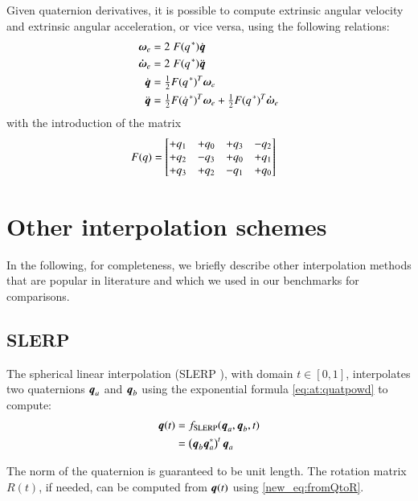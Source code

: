 Given quaternion derivatives, it is possible to compute extrinsic angular velocity and extrinsic angular acceleration, or vice versa, using the following relations:
\begin{align}
{\boldsymbol{\omega}}_e &= 2 \; {F}(q\hskip0.1em^*) \dot{{\boldsymbol{q}}} \\
{\boldsymbol{\dot{\omega}}}_e &= 2 \; {F}(q\hskip0.1em^*) \ddot{{\boldsymbol{q}}} \\
\dot{{\boldsymbol{q}}} &= \tfrac{1}{2} {F}(q\hskip0.1em^*)^T  {\boldsymbol{\omega}}_e  \\
\ddot{{\boldsymbol{q}}} &= \tfrac{1}{2} {F}(\dot{q}\hskip0.1em^*)^T  {\boldsymbol{\omega}}_e + \tfrac{1}{2} {F}(q\hskip0.1em^*)^T  {\boldsymbol{\dot{\omega}}}_e 
\end{align}
with the introduction of the matrix 
\begin{align}
\label{eq:at:rotFm} 
	{F(q)}&= 
	\left[
	\begin{matrix}
	 +q_1 & +q_0  & +q_3  & -q_2  \cr
	 +q_2 & -q_3  & +q_0  & +q_1  \cr
	 +q_3 & +q_2  & -q_1  & +q_0  
	\end{matrix}
	\right]
\end{align}

\section{Other interpolation schemes}
\label{app:otherinterpolations}
In the following, for completeness, we briefly describe other interpolation methods that are popular in literature and which we used in our benchmarks for comparisons.

\subsection{SLERP}
The spherical linear interpolation (SLERP \cite{shoemake1985animating}), with domain $t \in [0,1]$, interpolates two quaternions
${\boldsymbol{q}}_a$ and ${\boldsymbol{q}}_b$ using the exponential formula \eqref{eq:at:quatpowd} to compute:
%
\begin{align}
\label{eq:at:quatrotSLERPa}
 {\boldsymbol{q}}(t) &= f_{\text{SLERP}}({\boldsymbol{q}}_a,{\boldsymbol{q}}_b,t)  \nonumber \\
 &= \left( {\boldsymbol{q}}_b {\boldsymbol{q}}_a^{*} \right)^t {\boldsymbol{q}}_a
\end{align}

The norm of the quaternion is guaranteed to be unit length. The rotation matrix $R(t)$, if needed, can be computed from ${\boldsymbol{q}}(t)$ using \eqref{new_eq:fromQtoR}.


